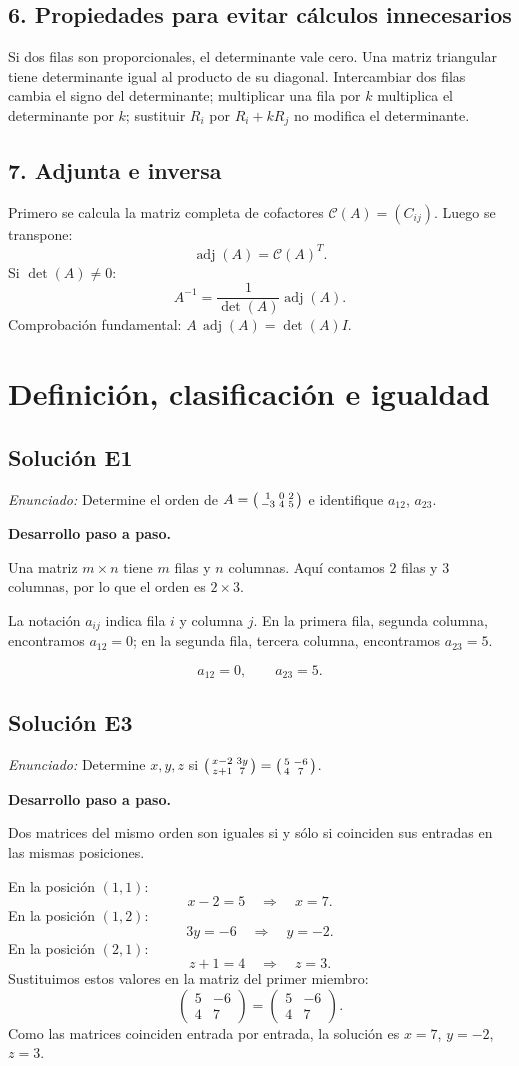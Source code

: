 \documentclass[12pt]{article}
\theoremstyle{remark}
\newcommand{\adj}{\operatorname{adj}}
\newcommand{\solucion}[2]{\Needspace{11\baselineskip}\subsection*{Solución E#1}\noindent\textit{Enunciado:} #2\par\medskip\noindent\textbf{Desarrollo paso a paso.}\par\medskip}
\begin{document}
\subsection*{6. Propiedades para evitar cálculos innecesarios}
Si dos filas son proporcionales, el determinante vale cero. Una matriz triangular tiene determinante igual al producto de su diagonal. Intercambiar dos filas cambia el signo del determinante; multiplicar una fila por $k$ multiplica el determinante por $k$; sustituir $R_i$ por $R_i+kR_j$ no modifica el determinante.
\subsection*{7. Adjunta e inversa}
Primero se calcula la matriz completa de cofactores $\mathcal C(A)=(C_{ij})$. Luego se transpone:
\[\adj(A)=\mathcal C(A)^T.\]
Si $\det(A)\ne0$:
\[\boxed{A^{-1}=\frac{1}{\det(A)}\adj(A)}.\]
Comprobación fundamental: $A\,\adj(A)=\det(A)I$.

\section{Definición, clasificación e igualdad}

\solucion{1}{Determine el orden de $A=\begin{psmallmatrix}1&0&2\\-3&4&5\end{psmallmatrix}$ e identifique $a_{12}$, $a_{23}$.}
Una matriz $m\times n$ tiene $m$ filas y $n$ columnas. Aquí contamos $2$ filas y $3$ columnas, por lo que el orden es $\boxed{2\times3}$.

La notación $a_{ij}$ indica fila $i$ y columna $j$. En la primera fila, segunda columna, encontramos $a_{12}=0$; en la segunda fila, tercera columna, encontramos $a_{23}=5$.

\[
\boxed{a_{12}=0,\qquad a_{23}=5}.
\]

\medskip

\solucion{3}{Determine $x,y,z$ si $\begin{psmallmatrix}x-2&3y\\z+1&7\end{psmallmatrix}=\begin{psmallmatrix}5&-6\\4&7\end{psmallmatrix}$.}
Dos matrices del mismo orden son iguales si y sólo si coinciden sus entradas en las mismas posiciones.

En la posición $(1,1)$:
\[
x - 2=5\quad\Longrightarrow\quad x=7.
\]
En la posición $(1,2)$:
\[
3 y=-6\quad\Longrightarrow\quad y=-2.
\]
En la posición $(2,1)$:
\[
z + 1=4\quad\Longrightarrow\quad z=3.
\]
Sustituimos estos valores en la matriz del primer miembro:
\[
\begin{pmatrix}5&-6\\4&7\end{pmatrix}=\begin{pmatrix}5&-6\\4&7\end{pmatrix}.
\]
Como las matrices coinciden entrada por entrada, la solución es $x=7$, $y=-2$, $z=3$.
\end{document}
